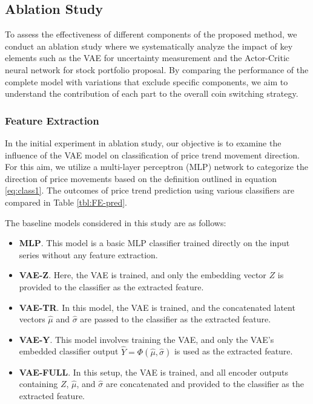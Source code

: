 \subsection{Ablation Study}

To assess the effectiveness of different components of the proposed method, we conduct an ablation study where we systematically analyze the impact of key elements such as the VAE for uncertainty measurement and the Actor-Critic neural network for stock portfolio proposal. By comparing the performance of the complete model with variations that exclude specific components, we aim to understand the contribution of each part to the overall coin switching strategy.

\subsubsection{Feature Extraction}
In the initial experiment in ablation study, our objective is to examine the influence of the VAE model on classification of price trend movement direction. For this aim, we utilize a multi-layer perceptron (MLP) network to categorize the direction of price movements based on the definition outlined in equation \eqref{eq:class1}. The outcomes of price trend prediction using various classifiers are compared in Table \ref{tbl:FE-pred}.

The baseline models considered in this study are as follows:
\begin{itemize}
	\item \textbf{MLP}. This model is a basic MLP classifier trained directly on the input series without any feature extraction.
	\item \textbf{VAE-Z}. Here, the VAE is trained, and only the embedding vector $Z$ is provided to the classifier as the extracted feature.
	\item \textbf{VAE-TR}. In this model, the VAE is trained, and the concatenated latent vectors $\hat{\mu}$ and $\hat{\sigma}$ are passed to the classifier as the extracted feature.
	\item \textbf{VAE-Y}. This model involves training the VAE, and only the VAE's embedded classifier output $\hat{Y} = \Phi(\hat{\mu}, \hat{\sigma})$ is used as the extracted feature.
	\item \textbf{VAE-FULL}. In this setup, the VAE is trained, and all encoder outputs containing $Z$, $\hat{\mu}$, and $\hat{\sigma}$ are concatenated and provided to the classifier as the extracted feature.
\end{itemize}

